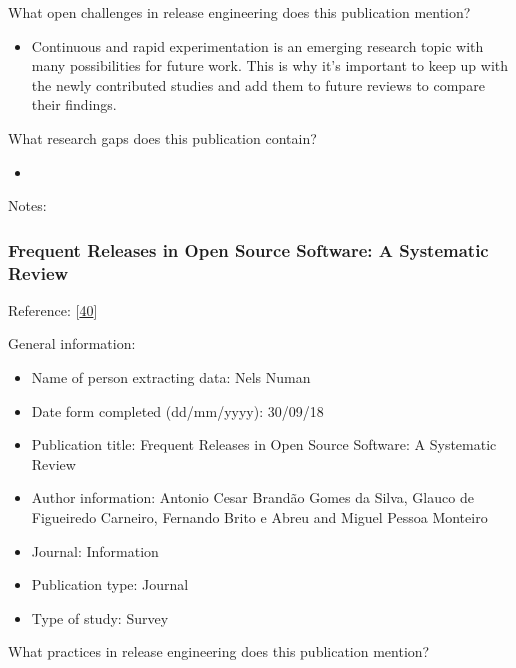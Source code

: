 \documentclass[]{book}
\providecommand{\tightlist}{%
  \setlength{\itemsep}{0pt}\setlength{\parskip}{0pt}}
\begin{document}
What open challenges in release engineering does this publication
mention?

\begin{itemize}
\tightlist
\item
  Continuous and rapid experimentation is an emerging research topic
  with many possibilities for future work. This is why it's important to
  keep up with the newly contributed studies and add them to future
  reviews to compare their findings.
\end{itemize}

What research gaps does this publication contain?

\begin{itemize}
\item
\end{itemize}

Notes:

\subsubsection{Frequent Releases in Open Source Software: A Systematic
Review}\label{frequent-releases-in-open-source-software-a-systematic-review}

Reference: {[}\protect\hyperlink{ref-cesar2017a}{40}{]}

General information:

\begin{itemize}
\tightlist
\item
  Name of person extracting data: Nels Numan
\item
  Date form completed (dd/mm/yyyy): 30/09/18
\item
  Publication title: Frequent Releases in Open Source Software: A
  Systematic Review
\item
  Author information: Antonio Cesar Brandão Gomes da Silva, Glauco de
  Figueiredo Carneiro, Fernando Brito e Abreu and Miguel Pessoa Monteiro
\item
  Journal: Information
\item
  Publication type: Journal
\item
  Type of study: Survey
\end{itemize}

What practices in release engineering does this publication mention?
\end{document}
